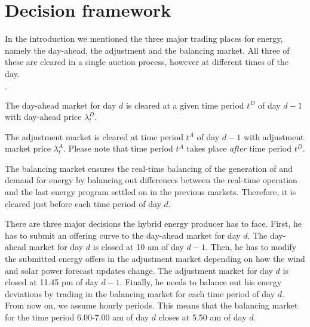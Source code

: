 \section{Decision framework}
In the introduction we mentioned the three major trading places for energy, namely the day-ahead, the adjustment and the balancing market. All three of these are cleared in a single auction process, however at different times of the day. 

\begin{list}{$\cdot$}{}
	\item The day-ahead market for day $d$ is cleared at a given time period $t^D$ of day $d-1$ with day-ahead price $\lambda_t^D$.
	\item The adjustment market is cleared at time period $t^{A}$ of day $d-1$ with adjustment market price $\lambda_t^A$. Please note that time period $t^{A}$ takes place \textit{after} time period $t^{D}$.
	\item The balancing market ensures the real-time balancing of the generation of and demand for energy by balancing out differences between the real-time operation and the last energy program settled on in the previous markets. Therefore, it is cleared just before each time period of day $d$. 
\end{list}
There are three major decisions the hybrid energy producer has to face. First, he has to submit an offering curve to the day-ahead market for day $d$. The day-ahead market for day $d$  is closed at 10 am of day $d-1$. Then, he has to modify the submitted energy offers in the adjustment market depending on how the wind and solar power forecast updates change. The adjustment market for day $d$  is closed at 11.45 pm of day $d-1$. Finally, he needs to balance out his energy deviations by trading in the balancing market for each time period of day $d$. From now on, we assume hourly periods. This means that the balancing market for the time period 6.00-7.00 am of day $d$ closes at 5.50 am of day $d$. 
\\

